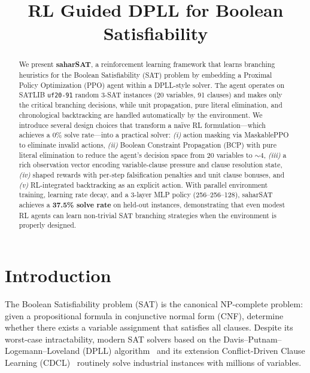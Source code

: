 \documentclass{article}
\title{RL Guided DPLL for Boolean Satisfiability}
\begin{document}
\maketitle

\begin{abstract}
We present \textbf{saharSAT}, a reinforcement learning framework that learns branching heuristics for the Boolean Satisfiability (SAT) problem by embedding a Proximal Policy Optimization (PPO) agent within a DPLL-style solver. The agent operates on SATLIB \texttt{uf20-91} random 3-SAT instances (20 variables, 91 clauses) and makes only the critical branching decisions, while unit propagation, pure literal elimination, and chronological backtracking are handled automatically by the environment. We introduce several design choices that transform a na\"ive RL formulation---which achieves a 0\% solve rate---into a practical solver: \emph{(i)} action masking via MaskablePPO to eliminate invalid actions, \emph{(ii)} Boolean Constraint Propagation (BCP) with pure literal elimination to reduce the agent's decision space from 20 variables to ${\sim}4$, \emph{(iii)} a rich observation vector encoding variable-clause pressure and clause resolution state, \emph{(iv)} shaped rewards with per-step falsification penalties and unit clause bonuses, and \emph{(v)} RL-integrated backtracking as an explicit action. With parallel environment training, learning rate decay, and a 3-layer MLP policy (256--256--128), saharSAT achieves a \textbf{37.5\% solve rate} on held-out instances, demonstrating that even modest RL agents can learn non-trivial SAT branching strategies when the environment is properly designed.
\end{abstract}

\section{Introduction}

The Boolean Satisfiability problem (SAT) is the canonical NP-complete problem: given a propositional formula in conjunctive normal form (CNF), determine whether there exists a variable assignment that satisfies all clauses. Despite its worst-case intractability, modern SAT solvers based on the Davis--Putnam--Logemann--Loveland (DPLL) algorithm~\cite{davis1962machine} and its extension Conflict-Driven Clause Learning (CDCL)~\cite{silva1997grasp} routinely solve industrial instances with millions of variables.
\end{document}
